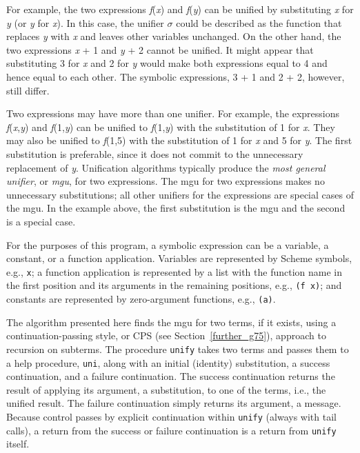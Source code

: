For example, the two expressions \textit{f}(\textit{x}) and \textit{f}(\textit{y}) can be unified by
substituting \textit{x} for \textit{y} (or \textit{y} for \textit{x}).
In this case, the unifier \(\sigma\) could be described as the function
that replaces \textit{y} with \textit{x} and leaves other variables unchanged.
On the other hand, the two expressions \textit{x} + 1 and \textit{y} + 2 cannot be
unified.
It might appear that substituting 3 for \textit{x} and 2 for \textit{y} would
make both expressions equal to 4 and hence equal to each other.
The symbolic expressions, 3 + 1 and 2 + 2, however, still differ.


Two expressions may have more than one unifier.
For example, the expressions \textit{f}(\textit{x},\textit{y}) and \textit{f}(1,\textit{y}) can be unified to
\textit{f}(1,\textit{y}) with the substitution of 1 for \textit{x}.
They may also be unified to \textit{f}(1,5) with the substitution of 1 for
\textit{x} and 5 for \textit{y}.
The first substitution is preferable, since it does not commit to
the unnecessary replacement of \textit{y}.
Unification algorithms typically produce the \textit{most general unifier},
or \textit{mgu}, for two expressions.
The mgu for two expressions makes no unnecessary substitutions; all
other unifiers for the expressions are special cases of the mgu.
In the example above, the first substitution is the mgu and the second
is a special case.


For the purposes of this program, a symbolic expression can be a variable,
a constant, or a function application.
Variables are represented by Scheme symbols, e.g., \texttt{x};
a function application is represented by a list with the function name in
the first position and its arguments in the remaining positions, e.g.,
\texttt{(f x)}; and
constants are represented by zero-argument functions, e.g., \texttt{(a)}.


The algorithm presented here finds the mgu for two terms, if it exists,
using a \label{examples_s77}continuation-passing style, or
CPS (see Section \ref{further_g75}),
approach to recursion on subterms.
The procedure \label{examples_s78}\texttt{unify} takes two terms and passes
them to a help procedure, \texttt{uni}, along with an initial (identity)
substitution, a success continuation, and a failure continuation.
The success continuation returns the result of applying its argument,
a substitution, to one of the terms, i.e., the unified result.
The failure continuation simply returns its argument, a message.
Because control passes by explicit continuation within \texttt{unify}
(always with tail calls), a return from the success or failure
continuation is a return from \texttt{unify} itself.


